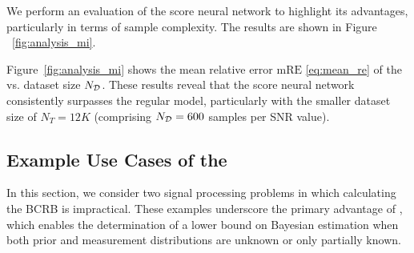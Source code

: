 {We perform an {evaluation of}  the \pe{} {score neural network} to highlight its advantages, particularly in terms of sample complexity.
The results are shown in Figure ~\ref{fig:analysis_mi}. 
    

Figure~\ref{fig:analysis_mi}  
shows
the mean relative error $\mathrm{mRE}$ \eqref{eq:mean_re}
{of the \name{}}  vs. dataset size $N_{\mathcal{D}}$. These results reveal that the \pe{} {score} neural network consistently surpasses the regular model, particularly with the smaller dataset size of $N_T=12K$ (comprising $N_{\mathcal{D}}=600$ samples per SNR value). 


\subsection{Example Use Cases of the \name{} }
In this section, we consider
two signal processing problems in which calculating the BCRB is impractical. These examples underscore the primary advantage of \name{}, which %
enables the determination of a lower bound on Bayesian estimation when both prior and measurement distributions are unknown or only partially known. 

}
